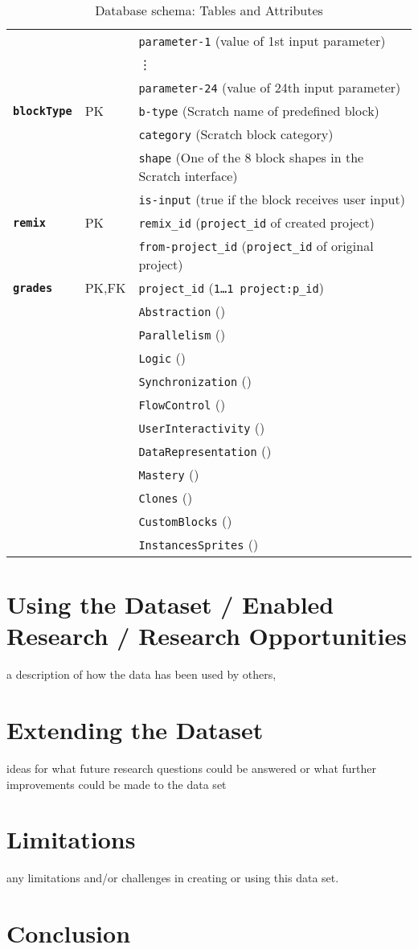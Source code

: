 \documentclass[10pt, conference]{IEEEtran}
\begin{document}
\begin{table}[ht]
\begin{tabular}{llp{5.4cm}}
		&  & \texttt{parameter-1} (value of 1st input parameter)\\
		&  &\vdots\\
		&  & \texttt{parameter-24} (value of 24th input parameter)\\
		\hline
		\textbf{\texttt{blockType}} & PK & \texttt{b-type} (Scratch name of predefined block)\\
		&  & \texttt{category} (Scratch block category)\\
		&  & \texttt{shape} (One of the 8 block shapes in the Scratch interface)\\
		&  & \texttt{is-input} (true if the block receives user input)\\
		\hline
		\textbf{\texttt{remix}} & PK  & \texttt{remix\_id} (\texttt{\scriptsize{project\_id}} of created project)\\
		&  & \texttt{from-project\_id} (\texttt{\scriptsize{project\_id}} of original project)\\
		\hline
		\textbf{\texttt{grades}} & PK,FK & \texttt{project\_id} (\texttt{\scriptsize{1\ldots1 project:p\_id}})\\
		& & \texttt{Abstraction} ()\\
		& & \texttt{Parallelism} ()\\
		& & \texttt{Logic} ()\\
		& & \texttt{Synchronization} ()\\
		& & \texttt{FlowControl} ()\\
		& & \texttt{UserInteractivity} ()\\
		& & \texttt{DataRepresentation} ()\\
		& & \texttt{Mastery} ()\\
		& & \texttt{Clones} ()\\
		& & \texttt{CustomBlocks} ()\\
		& & \texttt{InstancesSprites} ()\\
		\hline
	\end{tabular}
	\caption{Database schema: Tables and Attributes}
	\label{tbl-dbschema}
\end{table}

\section{Using the Dataset / Enabled Research / Research Opportunities}
a description of how the data has been used by others,

\section{Extending the Dataset}
ideas for what future research questions could be answered or what further improvements could be made to the data set

\section{Limitations}
any limitations and/or challenges in creating or using this data set.

\section{Conclusion}



\end{document}
